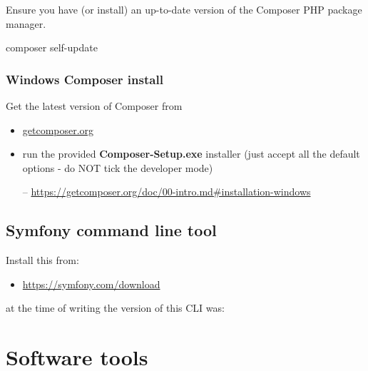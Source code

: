 \documentclass[a4paperpaper,openright]{book}
\newenvironment{Shaded}{}{}
\newcommand{\ExtensionTok}[1]{#1}
\newcommand{\NormalTok}[1]{#1}
\providecommand{\tightlist}{%
  \setlength{\itemsep}{0pt}\setlength{\parskip}{0pt}}
\begin{document}
Ensure you have (or install) an up-to-date version of the Composer PHP
package manager.

\begin{Shaded}
\begin{Highlighting}[]
    \ExtensionTok{composer}\NormalTok{ self-update}
\end{Highlighting}
\end{Shaded}

\hypertarget{windows-composer-install-1}{%
\subsection{Windows Composer install}\label{windows-composer-install-1}}

Get the latest version of Composer from

\begin{itemize}
\item
  \href{https://getcomposer.org/}{getcomposer.org}
\item
  run the provided \textbf{Composer-Setup.exe} installer (just accept
  all the default options - do NOT tick the developer mode)

  -- \url{https://getcomposer.org/doc/00-intro.md\#installation-windows}
\end{itemize}

\hypertarget{symfony-command-line-tool}{%
\section{Symfony command line tool}\label{symfony-command-line-tool}}

Install this from:

\begin{itemize}
\tightlist
\item
  \url{https://symfony.com/download}
\end{itemize}

at the time of writing the version of this CLI was:

\begin{Shaded}
\end{Shaded}

\hypertarget{software-tools-1}{%
\chapter{\texorpdfstring{Software
tools\label{appendix_software_setup}}{Software tools}}\label{software-tools-1}}
\end{document}
